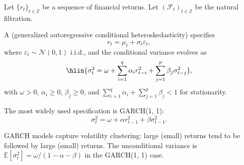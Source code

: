 \begin{definition} \label{definition:garch_models_for_conditional_heteroskedasticity_in_returns}
Let $\{r_t\}_{t \in \mathbb{Z}}$ be a sequence of financial returns. Let $(\mathcal{F}_t)_{t \in \mathbb{Z}}$ be the natural filtration.

A  (generalized autoregressive conditional heteroskedasticity) specifies
$$r_t = \mu_t + \sigma_t \varepsilon_t,$$
where $\varepsilon_t \sim \mathcal{N}(0, 1)$ i.i.d., and the conditional variance evolves as
$$\hlin{\sigma_t^2 = \omega + \sum_{i=1}^q \alpha_i r_{t-i}^2 + \sum_{j=1}^p \beta_j \sigma_{t-j}^2},$$
with $\omega > 0$, $\alpha_i \geq 0$, $\beta_j \geq 0$, and $\sum_{i=1}^q \alpha_i + \sum_{j=1}^p \beta_j < 1$ for stationarity.

The most widely used specification is GARCH(1, 1):
$$\sigma_t^2 = \omega + \alpha r_{t-1}^2 + \beta \sigma_{t-1}^2.$$

GARCH models capture volatility clustering: large (small) returns tend to be followed by large (small) returns. The unconditional variance is $\mathbb{E}[\sigma_t^2] = \omega / (1 - \alpha - \beta)$ in the GARCH(1, 1) case.
\end{definition}